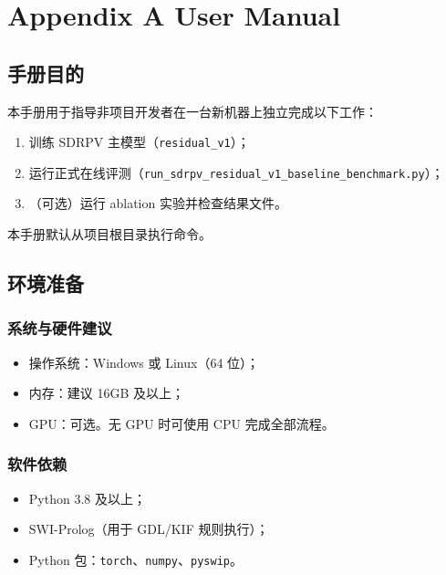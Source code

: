 ﻿\chapter{Appendix A User Manual}
\label{appendix:user_manual}

\setcounter{section}{0}
\setcounter{subsection}{0}
\renewcommand{\thesection}{A.\arabic{section}}
\renewcommand{\thesubsection}{A.\arabic{section}.\arabic{subsection}}

\section{手册目的}

本手册用于指导非项目开发者在一台新机器上独立完成以下工作：
\begin{enumerate}
    \item 训练 SDRPV 主模型（\texttt{residual\_v1}）；
    \item 运行正式在线评测（\texttt{run\_sdrpv\_residual\_v1\_baseline\_benchmark.py}）；
    \item （可选）运行 ablation 实验并检查结果文件。
\end{enumerate}

本手册默认从项目根目录执行命令。

\section{环境准备}

\subsection{系统与硬件建议}
\begin{itemize}
    \item 操作系统：Windows 或 Linux（64 位）；
    \item 内存：建议 16GB 及以上；
    \item GPU：可选。无 GPU 时可使用 CPU 完成全部流程。
\end{itemize}

\subsection{软件依赖}
\begin{itemize}
    \item Python 3.8 及以上；
    \item SWI-Prolog（用于 GDL/KIF 规则执行）；
    \item Python 包：\texttt{torch}、\texttt{numpy}、\texttt{pyswip}。
\end{itemize}

